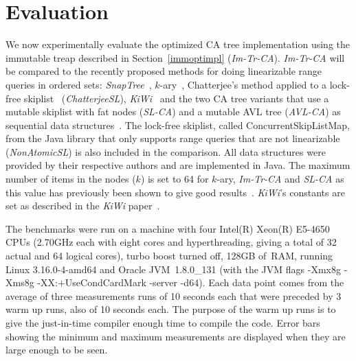\documentclass[a4paper,UKenglish]{oasics}
\newcommand{\kary}{\mbox{$k$-ary}\xspace}
\begin{document}


\section{Evaluation\label{sec:eval}}
We now experimentally evaluate the optimized CA tree implementation using the immutable treap described in Section~\ref{immoptimpl} (\emph{Im-Tr-CA}).
\emph{Im-Tr-CA} will be compared to the recently proposed methods for doing linearizable range queries in ordered sets: \emph{SnapTree}~\cite{bronson2010practical}, \kary{}~\cite{RangeQKArySeachTree}, Chatterjee's method applied to a lock-free skiplist~\cite{ChatterjeeLFRangeQueries} (\emph{ChatterjeeSL}), \emph{KiWi}~\cite{BasinKiWi} and the two CA tree variants that use a mutable skiplist with fat nodes (\emph{SL-CA}) and a mutable AVL tree (\mbox{\emph{AVL-CA}}) as sequential data structures~\cite{CATreeLCPC}. %
The lock-free skiplist, called ConcurrentSkipListMap, from the Java library that only supports range queries that are not linearizable (\emph{NonAtomicSL}) is also included in the comparison.
All data structures were provided by their respective authors and are implemented in Java.
The maximum number of items in the nodes ($k$) is set to 64 for \kary, \emph{Im-Tr-CA} and \emph{SL-CA} as this value has previously been shown to give good results~\cite{RangeQKArySeachTree}.
\emph{KiWi}'s constants are set as described in the \emph{KiWi} paper~\cite{BasinKiWi}.

The benchmarks were run on a machine with four Intel(R) Xeon(R) E5-4650 CPUs (2.70GHz each with eight cores and hyperthreading, giving a total of 32 actual and 64 logical cores), turbo boost turned off, 128GB of~RAM, running Linux 3.16.0-4-amd64 and Oracle JVM~1.8.0\_131 (with the JVM flags -Xmx8g -Xms8g -XX:+UseCondCardMark -server -d64).
Each data point comes from the average of three measurements runs of 10 seconds each that were preceded by 3 warm up runs, also of 10 seconds each.
The purpose of the warm up runs is to give the just-in-time compiler enough time to compile the code.
Error bars showing the minimum and maximum measurements are displayed when they are large enough to be seen.
\end{document}
